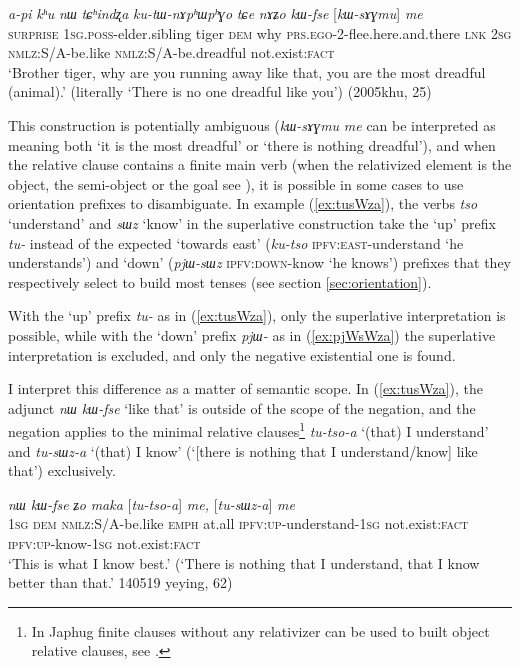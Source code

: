 \documentclass[oneside,a4paper,12pt]{article}
\newcommand{\ipa}[1]{{\phon\textit{#1}}}
\newcommand{\forme}[2]{\ipa{#1} `#2'}
\begin{document}
 \begin{exe}
\ex \label{ex:kWfse.me}
\gll \ipa{ama} 	\ipa{a-pi} 	\ipa{kʰu} 	\ipa{nɯ} 	\ipa{tɕʰindʐa} 	\ipa{ku-tɯ-nɤpʰɯpʰɣo} 	\ipa{tɕe}  \ipa{nɤʑo} 	\ipa{kɯ-fse} 	[\ipa{kɯ-sɤɣmu}] 	\ipa{me} 	\\
\textsc{surprise} \textsc{1sg.poss}-elder.sibling tiger \textsc{dem} why \textsc{prs.ego}-2-flee.here.and.there \textsc{lnk} \textsc{2sg}  \textsc{nmlz}:S/A-be.like   \textsc{nmlz}:S/A-be.dreadful  not.exist:\textsc{fact} \\
\glt `Brother tiger, why are you running away like that, you are the most dreadful (animal).' (literally `There is no one dreadful like you') (2005khu, 25)
\end{exe}

This construction is potentially ambiguous (\ipa{kɯ-sɤɣmu} \ipa{me} can be interpreted as meaning both  `it is the most dreadful' or `there is nothing dreadful'), and when the relative clause contains a finite main verb (when the relativized element is the object, the semi-object or the goal see \citealt{jacques16relatives}), it is possible in some cases to use orientation prefixes to disambiguate. In example (\ref{ex:tusWza}), the verbs \forme{tso}{understand} and \forme{sɯz}{know} in the superlative construction take the `up' prefix \ipa{tu-} instead of the expected `towards east' (\ipa{ku-tso} \textsc{ipfv:east}-understand `he understands') and `down' (\ipa{pjɯ-sɯz} \textsc{ipfv:down}-know `he knows') prefixes that they respectively select to build most tenses (see section \ref{sec:orientation}).

With the `up' prefix \ipa{tu-} as in (\ref{ex:tusWza}), only the superlative interpretation is possible, while with the `down' prefix \ipa{pjɯ-} as in (\ref{ex:pjWsWza}) the superlative interpretation is excluded, and only the negative existential one is found.

I interpret this difference as a matter of semantic scope. In (\ref{ex:tusWza}),  the adjunct \ipa{nɯ} \ipa{kɯ-fse} `like that' is outside of the scope of the negation, and the negation applies to the minimal relative clauses\footnote{In Japhug finite clauses without any relativizer can be used to built object relative clauses, see \citet{jacques16relatives}.} \ipa{tu-tso-a} `(that) I understand' and \ipa{tu-sɯz-a} `(that) I know' (`[there is nothing that I understand/know] like that') exclusively.

\begin{exe}
\ex \label{ex:tusWza}
\gll \ipa{aʑo} 	\ipa{nɯ} 	\ipa{kɯ-fse} 	\ipa{ʑo} 	\ipa{maka} [\ipa{tu-tso-a}] 	\ipa{me,} [\ipa{tu-sɯz-a}] 	\ipa{me} \\
\textsc{1sg} \textsc{dem} \textsc{nmlz}:S/A-be.like \textsc{emph} at.all \textsc{ipfv:up}-understand-\textsc{1sg} not.exist:\textsc{fact} \textsc{ipfv:up}-know-\textsc{1sg} not.exist:\textsc{fact} \\
\glt `This is what I know best.' (`There is nothing that I understand, that I know better than that.' 140519 yeying, 62)
\end{exe}
\end{document}

